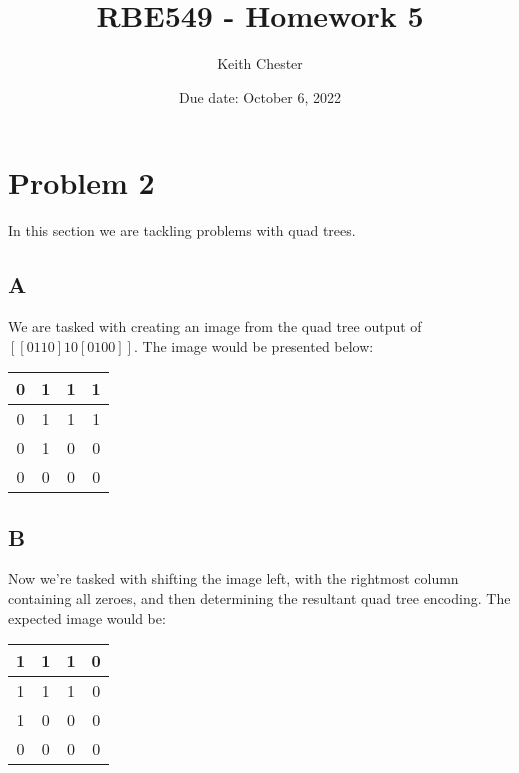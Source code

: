 \documentclass{article}
\title{RBE549 - Homework 5}
\author{Keith Chester}
\date{Due date: October 6, 2022}
\begin{document}
\maketitle



\section*{Problem 2}

In this section we are tackling problems with quad trees.

\subsection*{A}

We are tasked with creating an image from the quad tree output of $[[0110]10[0100]]$. The image would be presented below:

\begin{center}
    \begin{tabular}{ | c | c | c | c | }
        \hline
        0 & 1 & 1 & 1 \\ 
        \hline
        0 & 1 & 1 & 1 \\ 
        \hline
        0 & 1 & 0 & 0 \\ 
        \hline
        0 & 0 & 0 & 0 \\ 
        \hline  
    \end{tabular}
\end{center}

\subsection*{B}

Now we're tasked with shifting the image left, with the rightmost column containing all zeroes, and then determining the resultant quad tree encoding. The expected image would be:

\begin{center}
    \begin{tabular}{ | c | c | c | c | }
        \hline
        1 & 1 & 1 & 0 \\ 
        \hline
        1 & 1 & 1 & 0 \\ 
        \hline
        1 & 0 & 0 & 0 \\ 
        \hline
        0 & 0 & 0 & 0 \\ 
        \hline  
    \end{tabular}
\end{center}
\end{document}
